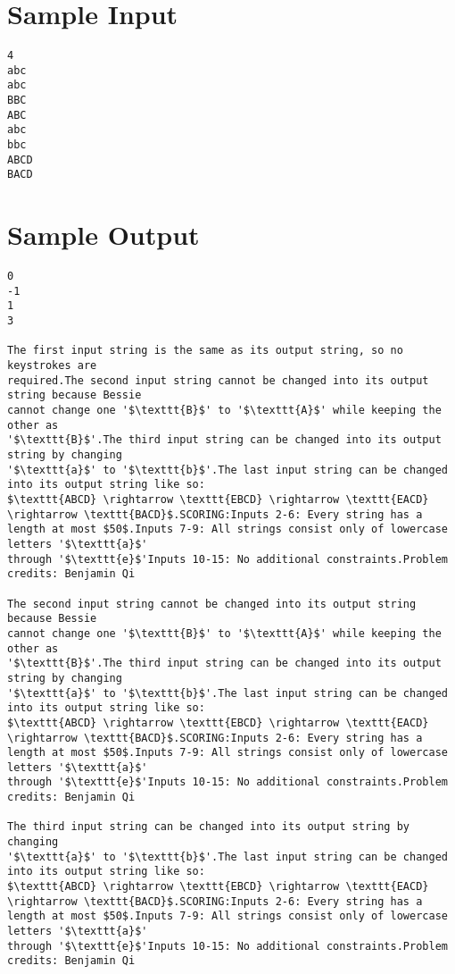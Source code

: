 \documentclass[12pt]{article}
\begin{document}
\section*{Sample Input}
\begin{verbatim}
4
abc
abc
BBC
ABC
abc
bbc
ABCD
BACD
\end{verbatim}

\section*{Sample Output}
\begin{verbatim}
0
-1
1
3

The first input string is the same as its output string, so no keystrokes are
required.The second input string cannot be changed into its output string because Bessie
cannot change one '$\texttt{B}$' to '$\texttt{A}$' while keeping the other as
'$\texttt{B}$'.The third input string can be changed into its output string by changing
'$\texttt{a}$' to '$\texttt{b}$'.The last input string can be changed into its output string like so:
$\texttt{ABCD} \rightarrow \texttt{EBCD} \rightarrow \texttt{EACD} \rightarrow \texttt{BACD}$.SCORING:Inputs 2-6: Every string has a length at most $50$.Inputs 7-9: All strings consist only of lowercase letters '$\texttt{a}$'
through '$\texttt{e}$'Inputs 10-15: No additional constraints.Problem credits: Benjamin Qi

The second input string cannot be changed into its output string because Bessie
cannot change one '$\texttt{B}$' to '$\texttt{A}$' while keeping the other as
'$\texttt{B}$'.The third input string can be changed into its output string by changing
'$\texttt{a}$' to '$\texttt{b}$'.The last input string can be changed into its output string like so:
$\texttt{ABCD} \rightarrow \texttt{EBCD} \rightarrow \texttt{EACD} \rightarrow \texttt{BACD}$.SCORING:Inputs 2-6: Every string has a length at most $50$.Inputs 7-9: All strings consist only of lowercase letters '$\texttt{a}$'
through '$\texttt{e}$'Inputs 10-15: No additional constraints.Problem credits: Benjamin Qi

The third input string can be changed into its output string by changing
'$\texttt{a}$' to '$\texttt{b}$'.The last input string can be changed into its output string like so:
$\texttt{ABCD} \rightarrow \texttt{EBCD} \rightarrow \texttt{EACD} \rightarrow \texttt{BACD}$.SCORING:Inputs 2-6: Every string has a length at most $50$.Inputs 7-9: All strings consist only of lowercase letters '$\texttt{a}$'
through '$\texttt{e}$'Inputs 10-15: No additional constraints.Problem credits: Benjamin Qi


\end{verbatim}
\end{document}
